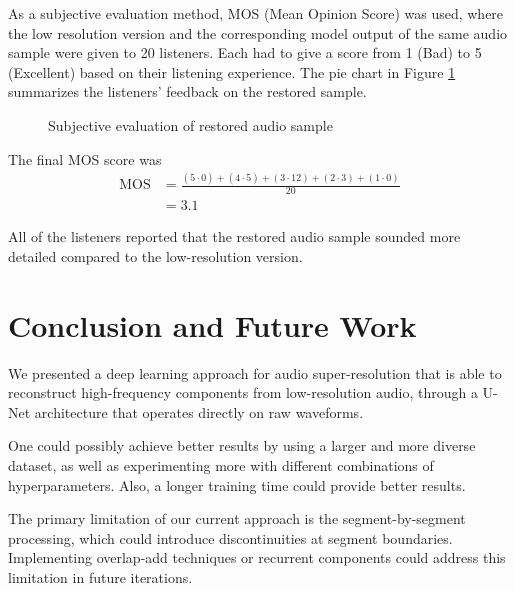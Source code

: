\documentclass{article}
\begin{document}
As a subjective evaluation method, MOS (Mean Opinion Score) was used, where the low resolution version and the corresponding model output of the same audio sample were given to 20 listeners.
Each had to give a score from 1 (Bad) to 5 (Excellent) based on their listening experience.
The pie chart in Figure \ref{fig:qualitative} summarizes the listeners' feedback on the restored sample.

\begin{figure}[!htb]
    \centering
    \caption{Subjective evaluation of restored audio sample}
    \label{fig:qualitative}
\end{figure}

The final MOS score was
\begin{align*}
    \text{MOS} &= \frac{(5 \cdot 0) + (4 \cdot 5) + (3 \cdot 12) + (2 \cdot 3) + (1 \cdot 0)}{20} \\
    &= 3.1
\end{align*}

All of the listeners reported that the restored audio sample sounded more detailed compared to the low-resolution version.

\section{Conclusion and Future Work}

We presented a deep learning approach for audio super-resolution that is able to reconstruct high-frequency components from low-resolution audio, through a U-Net architecture that operates directly on raw waveforms.

One could possibly achieve better results by using a larger and more diverse dataset, as well as experimenting more with different combinations of hyperparameters.
Also, a longer training time could provide better results.

The primary limitation of our current approach is the segment-by-segment processing, which could introduce discontinuities at segment boundaries.
Implementing overlap-add techniques or recurrent components could address this limitation in future iterations.
\end{document}
